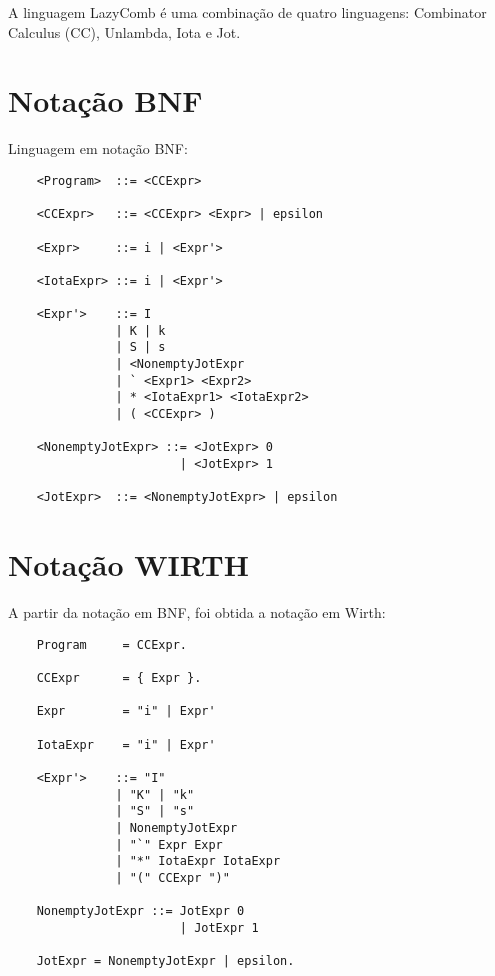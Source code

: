 \label{Cap:definicao-linguagem}

A linguagem LazyComb é uma combinação de quatro linguagens: Combinator Calculus (CC), Unlambda, Iota e Jot.

\section{Notação BNF}
\label{sec:notacao-bnf}

Linguagem em notação BNF:

\begin{lstlisting}
    <Program>  ::= <CCExpr>     
                    
    <CCExpr>   ::= <CCExpr> <Expr> | epsilon                   

    <Expr>     ::= i | <Expr'>                      

    <IotaExpr> ::= i | <Expr'>

    <Expr'>    ::= I                        
               | K | k                  
               | S | s                               
               | <NonemptyJotExpr           
               | ` <Expr1> <Expr2>            
               | * <IotaExpr1> <IotaExpr2>    
               | ( <CCExpr> )             

    <NonemptyJotExpr> ::= <JotExpr> 0                
                        | <JotExpr> 1                

    <JotExpr>  ::= <NonemptyJotExpr> | epsilon

\end{lstlisting}
%
\section{Notação WIRTH}

A partir da notação em BNF, foi obtida a notação em Wirth:

\begin{lstlisting}
    Program     = CCExpr.     
                    
    CCExpr      = { Expr }.                  

    Expr        = "i" | Expr'                      

    IotaExpr    = "i" | Expr'

    <Expr'>    ::= "I"                        
               | "K" | "k"                  
               | "S" | "s"                               
               | NonemptyJotExpr           
               | "`" Expr Expr       
               | "*" IotaExpr IotaExpr    
               | "(" CCExpr ")"             

    NonemptyJotExpr ::= JotExpr 0                
                        | JotExpr 1     

    JotExpr = NonemptyJotExpr | epsilon.           
\end{lstlisting}

